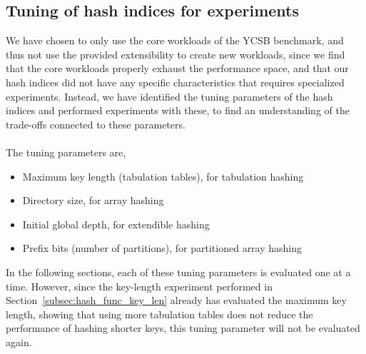 \documentclass[11pt]{report} %
\begin{document}
\subsection{Tuning of hash indices for experiments}
\label{subsec:tuning_experiments}
We have chosen to only use the core workloads of the YCSB benchmark, and thus not use the provided extensibility to create new workloads, since we find that the core workloads properly exhaust the performance space, and that our hash indices did not have any specific characteristics that requires specialized experiments. Instead, we have identified the tuning parameters of the hash indices and performed experiments with these, to find an understanding of the trade-offs connected to these parameters.\\
\\
The tuning parameters are,
\begin{itemize}
  \item Maximum key length (tabulation tables), for tabulation hashing
  \item Directory size, for array hashing
  \item Initial global depth, for extendible hashing
  \item Prefix bits (number of partitions), for partitioned array hashing
\end{itemize}
In the following sections, each of these tuning parameters is evaluated one at a time. However, since the key-length experiment performed in Section~\ref{subsec:hash_func_key_len} already has evaluated the maximum key length, showing that using more tabulation tables does not reduce the performance of hashing shorter keys, this tuning parameter will not be evaluated again. 
\end{document}
